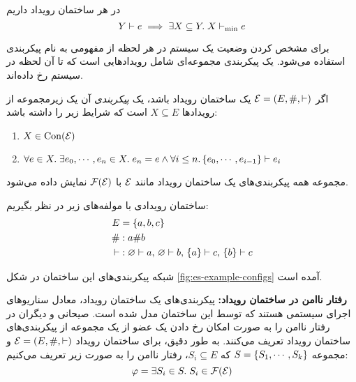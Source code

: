 \begin{proposition}
  در هر ساختمان رویداد داریم
  \begin{equation*}
    Y \vdash e \implies
    \exists X \subseteq Y.\;X \vdash_{\min} e
  \end{equation*}
\end{proposition}

برای مشخص کردن وضعیت یک سیستم در هر لحظه
از مفهومی به نام پیکر‌بندی
استفاده می‌شود. یک پیکربندی
مجموعه‌ای شامل رویدادهایی است که تا آن لحظه در سیستم رخ داده‌اند.

\begin{definition}\label{def:configuration}
  اگر
  $\mathcal{E} = (E,\#,\vdash)$
  یک ساختمان رویداد باشد، یک
  \textit{پیکربندی}
  آن یک زیرمجموعه از رویداد‌ها
  $X \subseteq E$
  است که شرایط زیر را داشته باشد:
  \begin{enumerate}[label=(\alph*)]
      \item $X \in \operatorname{Con}(\mathcal{E})$
      \item $
        \forall e \in X.\;
        \exists e_0, \cdots, e_n \in X.\;
        e_n = e \wedge
        \forall i \leq n. \left\{ e_0, \cdots, e_{i-1} \right\} \vdash e_i
      $
  \end{enumerate}
\end{definition}

مجموعه همه پیکربندی‌های یک ساختمان رویداد مانند
$\mathcal{E}$
با
$\operatorname{\mathcal{F}}(\mathcal{E})$
نمایش داده می‌شود.

\begin{example}\label{ex:event-structure}
  ساختمان رویدادی با مولفه‌های زیر در نظر بگیریم:
  \begin{align*}
    E & = \left\{ a, b, c \right\} \\
    \# & : a \# b \\
    \vdash & :
      \varnothing \vdash a,\,
      \varnothing \vdash b,\,
      \left\{ a \right\} \vdash c,\,
      \left\{ b \right\} \vdash c
  \end{align*}

  شبکه
  پیکربندی‌های این ساختمان در شکل
  \ref{fig:es-example-configs}
  آمده است.

  
\end{example}

\textbf{رفتار ناامن در ساختمان رویداد:}
پیکربندی‌های یک ساختمان رویداد،
معادل سناریوهای اجرای سیستمی هستند که توسط
این ساختمان مدل شده است. صیحانی و دیگران در
\cite{seyhani2022}
رفتار ناامن را به صورت امکان رخ دادن یک عضو از یک مجموعه
از پیکربندی‌های ساختمان رویداد تعریف می‌کنند.
به طور دقیق، برای ساختمان رویداد
$\mathcal{E}=(E,\#,\vdash)$
و مجموعه
$S=\left\{ S_1,\cdots,S_k \right\}$
که
$S_i \subseteq E$،
رفتار ناامن را به صورت زیر تعریف می‌کنیم:
\begin{equation}\label{eq:unsafe-behavior}
  \varphi = \exists S_i \in S.\; S_i \in \operatorname{\mathcal{F}}(\mathcal{E})
\end{equation}